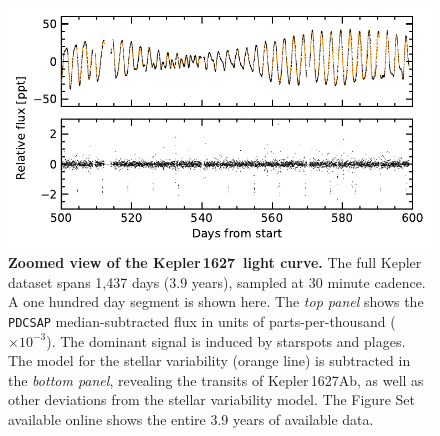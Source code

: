 \documentclass[12pt,modern,tighten]{aastex63}
\newcommand{\sn}{Kepler\,1627} %
\newcommand{\pn}{Kepler\,1627Ab} %
\begin{document}
\begin{figure}[t]
	\begin{center}
		\leavevmode
		\includegraphics[width=1\textwidth]{f4.pdf}
	\end{center}
	\vspace{-0.7cm}
	\caption{
		{\bf Zoomed view of the \sn\ light curve.}  
		The full Kepler dataset spans 1{,}437 days (3.9 years), sampled at
		30 minute cadence.  A one hundred day segment is shown here.  The {\it top panel} shows the
		\texttt{PDCSAP} median-subtracted flux in units of
		parts-per-thousand ($\times 10^{-3}$).  The dominant signal
		is induced by starspots and plages.  The model for the
		stellar variability (orange line) is subtracted in the {\it
			bottom panel}, revealing the transits of \pn, as well as other
		deviations from the stellar variability model.  The 
		Figure Set available online shows the entire 3.9 years of
		available data.
		\label{fig:lightcurve}
	}
\end{figure}
\end{document}
